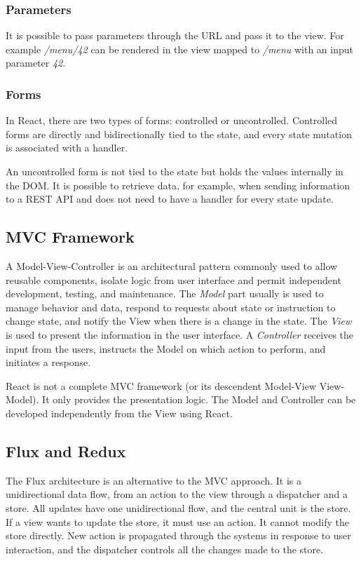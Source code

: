 \subsubsection*{Parameters}
It is possible to pass parameters through the URL and pass it to the view. For example \textit{/menu/42} can be rendered in the view mapped to \textit{/menu} with an input parameter \textit{42}.

\subsubsection*{Forms}
In React, there are two types of forms: controlled or uncontrolled.
Controlled forms are directly and bidirectionally tied to the state, and every state mutation is associated with a handler.

An uncontrolled form is not tied to the state but holds the values internally in the DOM. It is possible to retrieve data, for example, when sending information to a REST API and does not need to have a handler for every state update.


\subsection*{MVC Framework}
A Model-View-Controller is an architectural pattern commonly used to allow reusable components, isolate logic from user interface and permit independent development, testing, and maintenance. 
The \textit{Model} part usually is used to manage behavior and data, respond to requests about state or instruction to change state, and notify the View when there is a change in the state.
The \textit{View} is used to present the information in the user interface.
A \textit{Controller} receives the input from the users, instructs the Model on which action to perform, and initiates a response.

React is not a complete MVC framework (or its descendent Model-View View-Model). It only provides the presentation logic. The Model and Controller can be developed independently from the View using React.

\subsection*{Flux and Redux}
The Flux architecture is an alternative to the MVC approach. It is a unidirectional data flow, from an action to the view through a dispatcher and a store.
All updates have one unidirectional flow, and the central unit is the store. If a view wants to update the store, it must use an action. It cannot modify the store directly.
New action is propagated through the systems in response to user interaction, and the dispatcher controls all the changes made to the store.


